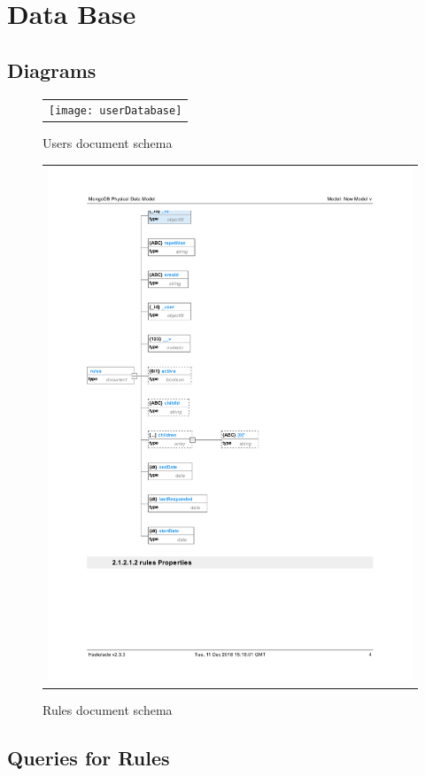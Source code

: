 \documentclass{sprawozdanie-agh}
\begin{document}
	\section{Data Base}

	\subsection{Diagrams}

		\begin{figure}[H] 
			\centering
			\begin{tabular}{c}
				\texttt{[image: userDatabase]}
			\end{tabular} 
			\caption{Users document schema}
		\end{figure}

		\begin{figure}[H] 
			\centering
			\begin{tabular}{c}
				\includegraphics[width=.70\textwidth]{rulesDatabase} 
			\end{tabular} 
			\caption{Rules document schema}
		\end{figure}

	\subsection{Queries for Rules}
\end{document}
